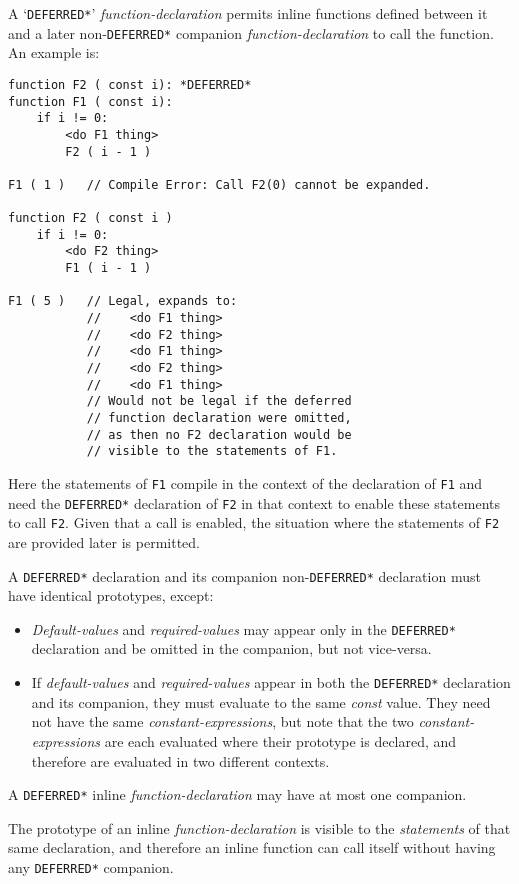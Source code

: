 \documentclass[12pt]{article}
\newenvironment{indpar}[1][0.3in]%
	{\begin{list}{}%
		     {\setlength{\itemsep}{0in}%
		      \setlength{\topsep}{0in}%
		      \setlength{\parsep}{1ex}%
		      \setlength{\labelwidth}{#1}%
		      \setlength{\leftmargin}{#1}%
		      \addtolength{\leftmargin}{\labelsep}}%
	 \item}%
	{\end{list}}
\begin{document}
A `{\tt *DEFERRED*}' {\em function-declaration} permits
inline functions defined between it and a later
non-{\tt *DEFERRED*} companion {\em function-declaration} to call the
function.  An example is:
\begin{indpar}\begin{verbatim}
function F2 ( const i): *DEFERRED*
function F1 ( const i):
    if i != 0:
        <do F1 thing>
        F2 ( i - 1 )

F1 ( 1 )   // Compile Error: Call F2(0) cannot be expanded.

function F2 ( const i )
    if i != 0:
        <do F2 thing>
        F1 ( i - 1 )

F1 ( 5 )   // Legal, expands to:
           //    <do F1 thing>
           //    <do F2 thing>
           //    <do F1 thing>
           //    <do F2 thing>
           //    <do F1 thing>
           // Would not be legal if the deferred
           // function declaration were omitted,
           // as then no F2 declaration would be
           // visible to the statements of F1.
\end{verbatim}\end{indpar}
Here the statements of {\tt F1} compile in the context
of the declaration of {\tt F1} and need the {\tt *DEFERRED*}
declaration of {\tt F2} in that context to enable these
statements to call {\tt F2}.  Given that a call is enabled,
the situation where the statements of {\tt F2} are provided later
is permitted.

A {\tt *DEFERRED*} declaration and its companion non-{\tt *DEFERRED*}
declaration must have identical prototypes, except:
\label{COMPANION-DECLARATION}
\begin{itemize}
\item {\em Default-values} and {\em required-values} may appear
only in the {\tt *DEFERRED*} declaration
and be omitted in the companion, but not vice-versa.
\item If {\em default-values} and {\em required-values} appear
in both the {\tt *DEFERRED*} declaration and its companion,
they must evaluate to the same {\em const} value.  They need not
have the same {\em constant-expressions}, but note
that the two {\em constant-expressions} are each evaluated where
their prototype is declared, and therefore are evaluated in
two different contexts.
\end{itemize}

A {\tt *DEFERRED*} inline {\em function-declaration} may have at
most one companion.

The prototype of an inline {\em function-declaration} is visible
to the {\em statements} of that same declaration, and therefore
an inline function can call itself without having any {\tt *DEFERRED*}
companion.
\end{document}
